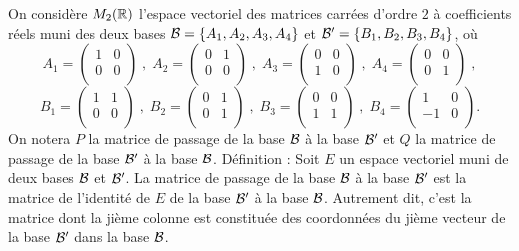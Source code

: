 \begin{question}
On considère $M_2(\mathbb{R})$ l'espace vectoriel des matrices carrées d'ordre $2$ à coefficients réels muni des deux bases ${\cal {B}}= \{ A_1,A_2,A_3,A_4\}$ et ${\cal {B'}}= \{ B_1,B_2,B_3,B_4\}$, où
$$A_1 = \left(\begin{array}{rc}1&0\\0&0\\ \end{array}\right) \; , \; A_2 = \left(\begin{array}{rc}0&1\\
0&0\\ \end{array}\right) \; , \; A_3 = \left(\begin{array}{rc}
0&0\\
1&0\\ \end{array}\right) \; , \; A_4 = \left(\begin{array}{rc}
0&0\\0&1\\ \end{array}\right) \; , $$
$$ B_1 = \left(\begin{array}{rc}1&1\\
0&0\\ \end{array}\right) \; , \; B_2 = \left(\begin{array}{rc}
0&1\\0&1\\ \end{array}\right) \; , \; B_3 = \left(\begin{array}{rc}
0&0\\ 1&1\\ \end{array}\right) \; ,\; B_4 = \left(\begin{array}{rc}
1&0\\-1&0\\ \end{array}\right).$$
On notera $P$ la matrice de passage de la base ${\cal {B}}$ à la base ${\cal {B'}}$ et $Q$ la matrice de passage de la base ${\cal {B'}}$ à la base ${\cal {B}}$.
\vskip1mm
Définition : Soit $E$ un espace vectoriel muni de deux bases ${\cal {B}}$ et ${\cal {B}}'$. La matrice de passage de la base ${\cal {B}}$ à la base  ${\cal {B}}'$ est la matrice de l'identité de $E$ de la base ${\cal {B}}'$ à la base  ${\cal {B}}$. Autrement dit, c'est la matrice dont la jième colonne est constituée des coordonnées du jième vecteur de la base ${\cal {B}'}$ dans la base  ${\cal {B}}$.

\end{question}
